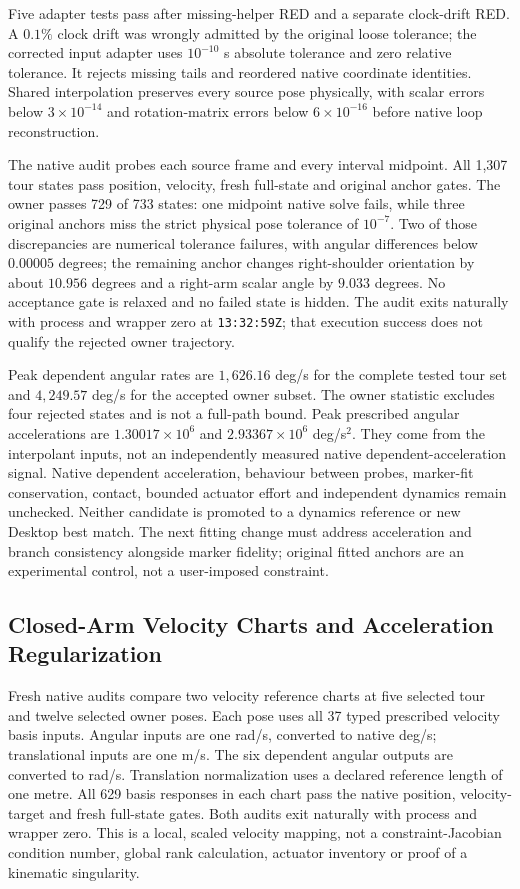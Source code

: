 \documentclass[11pt,a4paper]{article}
\begin{document}
Five adapter tests pass after missing-helper RED and a separate clock-drift
RED. A $0.1\%$ clock drift was wrongly admitted by the original loose
tolerance; the corrected input adapter uses $10^{-10}$ s absolute tolerance
and zero relative tolerance. It rejects missing tails and reordered native
coordinate identities. Shared interpolation preserves every source pose
physically, with scalar errors below $3\times10^{-14}$ and rotation-matrix
errors below $6\times10^{-16}$ before native loop reconstruction.

The native audit probes each source frame and every interval midpoint.
All 1,307 tour states pass position, velocity, fresh full-state and original
anchor gates. The owner passes 729 of 733 states: one midpoint native solve
fails, while three original anchors miss the strict physical pose tolerance
of $10^{-7}$. Two of those discrepancies are numerical tolerance failures,
with angular differences below $0.00005$ degrees; the remaining anchor
changes right-shoulder orientation by about $10.956$ degrees and a right-arm
scalar angle by $9.033$ degrees. No acceptance gate is relaxed and no failed
state is hidden. The audit exits naturally with process and wrapper zero at
\texttt{13:32:59Z}; that execution success does not qualify the rejected owner
trajectory.

Peak dependent angular rates are $1,626.16$ deg/s for the complete tested tour
set and $4,249.57$ deg/s for the accepted owner subset. The owner statistic
excludes four rejected states and is not a full-path bound. Peak prescribed
angular accelerations are $1.30017\times10^6$ and
$2.93367\times10^6$ deg/s$^2$. They come from the interpolant inputs, not
an independently measured native dependent-acceleration signal. Native
dependent acceleration, behaviour between probes, marker-fit conservation,
contact, bounded actuator effort and independent dynamics remain unchecked.
Neither candidate is promoted to a dynamics reference or new Desktop best
match. The next fitting change must address acceleration and branch
consistency alongside marker fidelity; original fitted anchors are an
experimental control, not a user-imposed constraint.

\subsection{Closed-Arm Velocity Charts and Acceleration Regularization}
Fresh native audits compare two velocity reference charts at five selected
tour and twelve selected owner poses. Each pose uses all 37 typed prescribed
velocity basis inputs. Angular inputs are one rad/s, converted to native
deg/s; translational inputs are one m/s. The six dependent angular outputs
are converted to rad/s. Translation normalization uses a declared reference
length of one metre. All 629 basis responses in each chart pass the native
position, velocity-target and fresh full-state gates. Both audits exit
naturally with process and wrapper zero. This is a local, scaled velocity
mapping, not a constraint-Jacobian condition number, global rank calculation,
actuator inventory or proof of a kinematic singularity.
\end{document}

